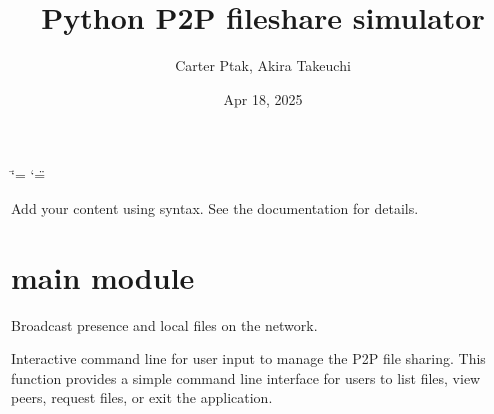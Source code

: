 \documentclass[letterpaper,10pt,english]{sphinxmanual}
\title{Python P2P fileshare simulator}
\date{Apr 18, 2025}
\author{Carter Ptak, Akira Takeuchi}
\begin{document}
\ifdefined\shorthandoff
  \ifnum\catcode`\=\string=\active\shorthandoff{=}\fi
  \ifnum\catcode`\"=\active{}\fi
\fi

\pagestyle{empty}
\sphinxmaketitle
\pagestyle{plain}
\sphinxtableofcontents
\pagestyle{normal}
\label{\detokenize{index::doc}}


\sphinxAtStartPar
Add your content using  syntax. See the
documentation for details.

\sphinxstepscope


\chapter{main module}
\label{\detokenize{main:module-main}}\label{\detokenize{main:main-module}}\label{\detokenize{main::doc}}

\begin{fulllineitems}
\label{\detokenize{main:main.broadcast_presence}}
\pysigstartsignatures
\pysiglinewithargsret
{}
{}
{}
\pysigstopsignatures
\sphinxAtStartPar
Broadcast presence and local files on the network.

\end{fulllineitems}


\begin{fulllineitems}
\label{\detokenize{main:main.command_line}}
\pysigstartsignatures
\pysiglinewithargsret
{}
{}
{}
\pysigstopsignatures
\sphinxAtStartPar
Interactive command line for user input to manage the P2P file sharing.
This function provides a simple command line interface for users to list files,
view peers, request files, or exit the application.

\end{fulllineitems}

\end{document}
